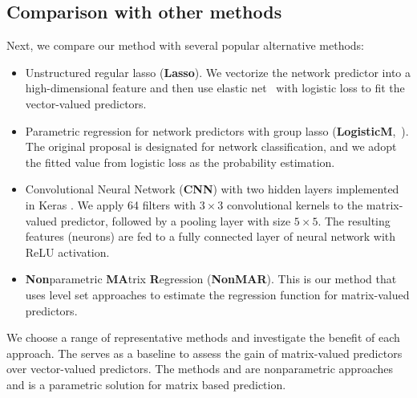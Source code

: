 \documentclass[11pt]{article}
\theoremstyle{plain}
\theoremstyle{definition}
\def\CNN{\text{\bf \small CNN }}
\def\Lasso{\text{\bf \small Lasso }}
\def\NonparaM{\text{\bf \small NonMAR }}
\def\LogisticM{\text{\bf \small LogisticM }}
\begin{document}
\subsection{Comparison with other methods}\label{sec:comparison}
Next, we compare our method with several popular alternative methods:
\begin{itemize}[wide, labelwidth=!, labelindent=0pt]
\item Unstructured regular lasso ({\bf \small Lasso}). We vectorize the network predictor into a high-dimensional feature and then use elastic net~\citep{friedman2010regularization} with logistic loss to fit the vector-valued predictors.  
\item Parametric regression for network predictors with group lasso ({\bf \small LogisticM},~\cite{relion2019network}). The original proposal is designated for network classification, and we adopt the fitted value from logistic loss as the probability estimation. 
\item Convolutional Neural Network ({\bf \small CNN}) with two hidden layers implemented in Keras \citep{chollet2018deep}. We apply 64 filters with $3\times 3$ convolutional kernels to the matrix-valued predictor, followed by a pooling layer with size $5\times 5$. The resulting features (neurons) are fed to a fully connected layer of neural network with ReLU activation. 
\item {\bf \small Non}parametric {\bf \small MA}trix {\bf \small R}egression ({\bf \small NonMAR}). This is our method that uses level set approaches to estimate the regression function for matrix-valued predictors. 
\end{itemize}
We choose a range of representative methods and investigate the benefit of each approach. The \Lasso serves as a baseline to assess the gain of matrix-valued predictors over vector-valued predictors. The methods \CNN and \NonparaM are nonparametric approaches and \LogisticM is a parametric solution for matrix based prediction.  
\end{document}
